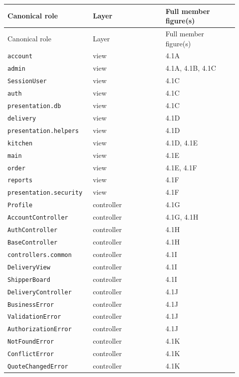 \begin{longtable}{>{\raggedright\arraybackslash}p{0.3067\linewidth}>{\raggedright\arraybackslash}p{0.3067\linewidth}>{\raggedright\arraybackslash}p{0.3067\linewidth}}
Canonical role & Layer & Full member figure(s) \\
\hline\endfirsthead
Canonical role & Layer & Full member figure(s) \\
\hline\endhead
\texttt{account} & view & 4.1A \\
\texttt{admin} & view & 4.1A, 4.1B, 4.1C \\
\texttt{SessionUser} & view & 4.1C \\
\texttt{auth} & view & 4.1C \\
\texttt{presentation.\allowbreak{}db} & view & 4.1C \\
\texttt{delivery} & view & 4.1D \\
\texttt{presentation.\allowbreak{}helpers} & view & 4.1D \\
\texttt{kitchen} & view & 4.1D, 4.1E \\
\texttt{main} & view & 4.1E \\
\texttt{order} & view & 4.1E, 4.1F \\
\texttt{reports} & view & 4.1F \\
\texttt{presentation.\allowbreak{}security} & view & 4.1F \\
\texttt{Profile} & controller & 4.1G \\
\texttt{AccountController} & controller & 4.1G, 4.1H \\
\texttt{AuthController} & controller & 4.1H \\
\texttt{BaseController} & controller & 4.1H \\
\texttt{controllers.\allowbreak{}common} & controller & 4.1I \\
\texttt{DeliveryView} & controller & 4.1I \\
\texttt{ShipperBoard} & controller & 4.1I \\
\texttt{DeliveryController} & controller & 4.1J \\
\texttt{BusinessError} & controller & 4.1J \\
\texttt{ValidationError} & controller & 4.1J \\
\texttt{AuthorizationError} & controller & 4.1J \\
\texttt{NotFoundError} & controller & 4.1K \\
\texttt{ConflictError} & controller & 4.1K \\
\texttt{QuoteChangedError} & controller & 4.1K \\

\end{longtable}
